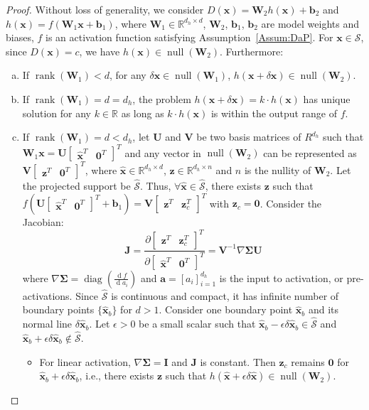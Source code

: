 \documentclass{article} %
\theoremstyle{plain}
\newtheorem*{proposition 1*}{Proposition 1}
\DeclareMathOperator{\diag}{diag}
\DeclareMathOperator{\dr}{d}  %
\DeclareMathOperator{\nul}{null}
\DeclareMathOperator{\rank}{rank}
\newcommand{\rvect}[1]{\begin{bmatrix} #1 \end{bmatrix}}
\newcommand{\ds}[1]{\mathcal{#1}}  %
\newcommand{\set}[1]{\mathbb{#1}}  %
\begin{document}
\begin{appendices}
\begin{proof}
	Without loss of generality, we consider \(D(\bm{x})=\bm{W}_2h(\bm{x})+\bm{b}_2\) and \(h(\bm{x})=f(\bm{W}_1\bm{x}+\bm{b}_1)\), where \(\bm{W}_1\in{\mathbb{R}^{d_h\times{d}}}\), \(\bm{W}_2\), \(\bm{b}_1\), \(\bm{b}_2\) are model weights and biases, \(f\) is an activation function satisfying Assumption~\ref{Assum:DaP}. For \(\bm{x}\in\ds{S}\), since \(D(\bm{x})=c\), we have \(h(\bm{x})\in\nul(\bm{W}_2)\). Furthermore:
	\begin{enumerate}[(a),leftmargin=*]
		\item If \(\rank(\bm{W}_1)<d\), for any \(\delta\bm{x}\in\nul(\bm{W}_1)\), \(h(\bm{x}+\delta\bm{x})\in\nul(\bm{W}_2)\).
		\item If \(\rank(\bm{W}_1)=d=d_h\), the problem \(h(\bm{x}+\delta\bm{x})=k\cdot h(\bm{x})\) has unique solution for any \(k\in\set{R}\) as long as \(k\cdot h(\bm{x})\) is within the output range of \(f\).
		\item If \(\rank(\bm{W}_1)=d<d_h\), let \(\bm{U}\) and \(\bm{V}\) be two basis matrices of \(R^{d_h}\) such that \(\bm{W}_1\bm{x}=\bm{U}\rvect{\hat{\bm{x}}^T&\bm{0}^T}^T\) and any vector in \(\nul(\bm{W}_2)\) can be represented as \(\bm{V}\rvect{\bm{z}^T&\bm{0}^T}^T\), where \(\hat{\bm{x}}\in{\mathbb{R}^{d_h\times{d}}}\), \(\bm{z}\in{\mathbb{R}^{d_h\times{n}}}\) and \(n\) is the nullity of \(\bm{W}_2\). Let the projected support be \(\hat{\ds{S}}\). Thus, \(\forall\hat{\bm{x}}\in\hat{\ds{S}}\), there exists \(\bm{z}\) such that \(f(\bm{U}\rvect{\hat{\bm{x}}^T&\bm{0}^T}^T+\bm{b}_1)=\bm{V}\rvect{\bm{z}^T&\bm{z}_c^T}^T\) with \(\bm{z}_c=\bm{0}\). Consider the Jacobian:
		\begin{equation}
		\bm{J}=\frac{\partial\rvect{\bm{z}^T&\bm{z}_c^T}^T}{\partial\rvect{\hat{\bm{x}}^T&\bm{0}^T}^T}=\bm{V}^{-1}\nabla{\bm{\Sigma}}\bm{U}
		\end{equation}
		where \(\nabla{\bm{\Sigma}}=\diag(\frac{\dr f}{\dr a_i})\) and \(\bm{a}=[a_i]_{i=1}^{d_h}\) is the input to activation, or pre-activations. Since \(\hat{\ds{S}}\) is continuous and compact, it has infinite number of boundary points \(\{\hat{\bm{x}}_b\}\) for \(d>1\). Consider one boundary point \(\hat{\bm{x}}_b\) and its normal line \(\delta\hat{\bm{x}}_b\). Let \(\epsilon>0\) be a small scalar such that \(\hat{\bm{x}}_b-\epsilon\delta\hat{\bm{x}}_b\in\hat{\ds{S}}\) and \(\hat{\bm{x}}_b+\epsilon\delta\hat{\bm{x}}_b\not\in\hat{\ds{S}}\). 
		\begin{itemize}[leftmargin=*]
			\item For linear activation, \(\nabla\bm{\Sigma}=\bm{I}\) and \(\bm{J}\) is constant. Then \(\bm{z}_c\) remains \(\bm{0}\) for \(\hat{\bm{x}}_b+\epsilon\delta\hat{\bm{x}}_b\), i.e., there exists \(\bm{z}\) such that \(h(\hat{\bm{x}}+\epsilon\delta\hat{\bm{x}})\in\nul(\bm{W}_2)\).

\end{itemize}
\end{enumerate}
\end{proof}
\end{appendices}
\end{document}
